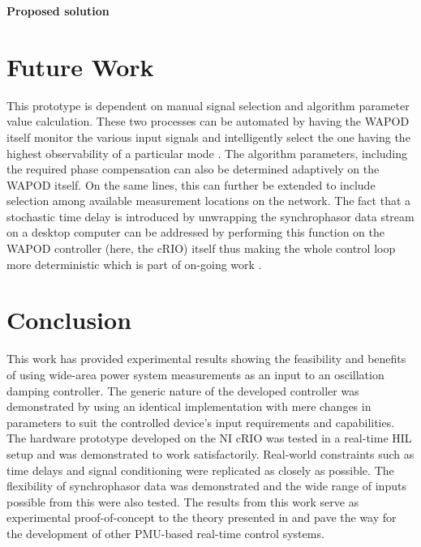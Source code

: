 \documentclass{ieeeaccess}
\begin{document}
\textbf{Proposed solution}

\section{Future Work}\label{Future}

This prototype is dependent on manual signal selection and algorithm parameter value calculation. These two processes can be automated by having the WAPOD itself monitor the various input signals and intelligently select the one having the highest observability of a particular mode \cite{Yuwa}. The algorithm parameters, including the required phase compensation can also be determined adaptively on the WAPOD itself. On the same lines, this can further be extended to include selection among available measurement locations on the network. The fact that a stochastic time delay is introduced by unwrapping the synchrophasor data stream on a desktop computer can be addressed by performing this function on the WAPOD controller (here, the cRIO) itself thus making the whole control loop more deterministic which is part of on-going work \cite{Audur}. 

\section{Conclusion}\label{Conclusion}
This work has provided experimental results showing the feasibility and benefits of using wide-area power system measurements as an input to an oscillation damping controller. The generic nature of the developed controller was demonstrated by using an identical implementation with mere changes in parameters to suit the controlled device's input requirements and capabilities. The hardware prototype developed on the NI cRIO was tested in a real-time HIL setup and was demonstrated to work satisfactorily. Real-world constraints such as time delays and signal conditioning were replicated as closely as possible. The flexibility of synchrophasor data was demonstrated and the wide range of inputs possible from this were also tested. The results from this work serve as experimental proof-of-concept to the theory presented in \cite{Yuwa} and pave the way for the development of other PMU-based real-time control systems.
\end{document}
